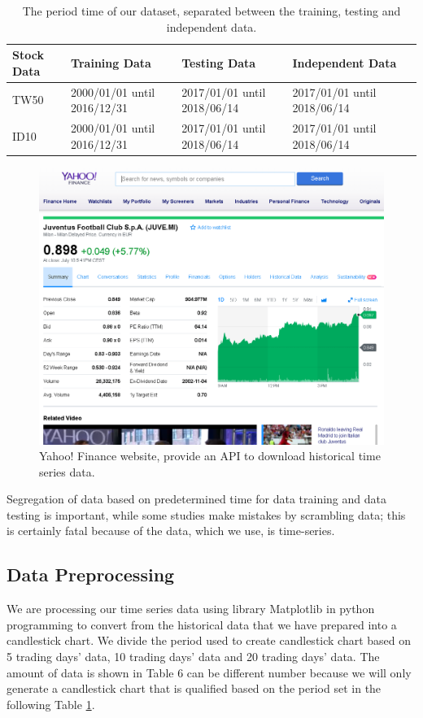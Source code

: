 \documentclass[10pt,twocolumn]{article}
\begin{document}
\begin{table}
    \caption{The period time of our dataset, separated between the training, testing and independent data.}
    \begin{tabularx}{\columnwidth}{X|X|X|X|X}
        \hline
        Stock Data	& Training Data    & Testing Data & Independent Data\\
        \hline
        TW50 & 2000/01/01 until 2016/12/31 & 2017/01/01 until 2018/06/14 & 2017/01/01 until 2018/06/14  \\
        ID10 & 2000/01/01 until 2016/12/31 & 2017/01/01 until 2018/06/14 & 2017/01/01 until 2018/06/14  \\
        \hline
    \end{tabularx}
    \label{Tab:datasettime}
\end{table}

\begin{figure}
  \includegraphics[width=\linewidth]{figures/juvemarket.png}
  \caption{Yahoo! Finance website, provide an API to download historical time series data.}
  \label{fig:juvemarket}
\end{figure}
\par
Segregation of data based on predetermined time for data training and data testing is important, while some studies make mistakes by scrambling data; this is certainly fatal because of the data, which we use, is time-series.

\subsection{Data Preprocessing}
We are processing our time series data using library Matplotlib \cite{hunter2007matplotlib} in python programming to convert from the historical data that we have prepared into a candlestick chart. We divide the period used to create candlestick chart based on 5 trading days’ data, 10 trading days’ data and 20 trading days’ data. 
The amount of data is shown in Table 6 can be different number because we will only generate a candlestick chart that is qualified based on the period set in the following Table \ref{Tab:datasettime}.
\end{document}
